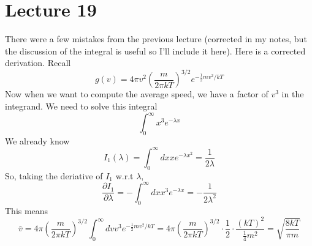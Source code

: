 \documentclass{report}
\numberwithin{equation}{section}
\newcommand{\pd}[2]{\frac{\partial #1}{\partial #2}}
\begin{document}
\section{Lecture 19}
There were a few mistakes from the previous lecture (corrected in my notes, but the discussion of the integral is useful so I'll include it here). Here is a corrected derivation. Recall 
\begin{equation*}
    g(v) = 4\pi v^2\left(\frac{m}{2\pi kT}\right)^{3/2}e^{-\frac{1}{2}mv^2/kT}
\end{equation*}
Now when we want to compute the average speed, we have a factor of $v^3$ in the integrand. We need to solve this integral
\begin{equation*}
    \int_0^{\infty}x^3 e^{-\lambda x}
\end{equation*}
We already know 
\begin{equation*}
    I_1(\lambda) = \int^{\infty}_0 dx xe^{-\lambda x^2} = \frac{1}{2\lambda}
\end{equation*}
So, taking the deriative of $I_1$ w.r.t $\lambda$, 
\begin{equation*}
    \pd{I_1}{\lambda} = -\int^{\infty}_0 dx x^3 e^{-\lambda x} = -\frac{1}{2\lambda^2}
\end{equation*}
This means
\begin{equation}
    \bar{v} = 4\pi\left(\frac{m}{2\pi kT}\right)^{3/2}\int^{\infty}_0 dv v^3 e^{-\frac{1}{2}mv^2/kT} = 4\pi\left(\frac{m}{2\pi kT}\right)^{3/2}\cdot\frac{1}{2}\cdot \frac{(kT)^2}{\frac{1}{4}m^2} = \sqrt{\frac{8kT}{\pi m}}
\end{equation}
\end{document}
